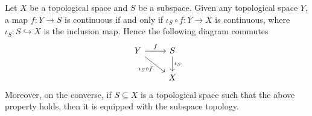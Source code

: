\begin{theorem}
  Let \(X\) be a topological space and \(S\) be a subspace. Given any
  topological space \(Y\), a map \(f: Y \to S\) is continuous if and only if
  \(\iota_S \circ f : Y \to X\) is continuous, where \(\iota_S: S
  \hookrightarrow X\) is the inclusion map. Hence the following diagram commutes
  \[
    \begin{tikzcd}
      Y \ar[r, "f"] \ar[rd, swap, "\iota_S \circ f"]
        &S \ar[d, "\iota_S"] \\
        &X
    \end{tikzcd}
  \]
  Moreover, on the converse, if \(S \subseteq X\) is a topological space such
  that the above property holds, then it is equipped with the subspace topology.
\end{theorem}

